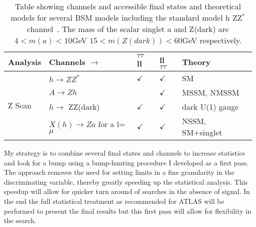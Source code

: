 \begin{table}[h]
\begin{center}
\begin{tabular}{ l |  l    |  l                   | l         || l    }  \hline 
 Analysis   & Channels        $\rightarrow$  &  $\tau \tau$ ll  & ll $\tau \tau$  &   Theory  \\ \hline \hline
\multirow{4}{*}{Z Scan} & $h\rightarrow ZZ^*$ &  $\checkmark$ & $\checkmark$                     & SM \\  

  &$A \rightarrow Zh$            &                    & $\checkmark$     &   MSSM, NMSSM \\  
  &$h \rightarrow$ ZZ(dark)  &    $ \checkmark$          & $\checkmark$  &dark U(1) gauge     \\   
  &$X(h) \rightarrow  Za$ for a l=$\mu$  &  $\checkmark$      & $\checkmark$ &   NSSM, SM+singlet\\ \hline \hline

    \hline
    \end{tabular}
    \caption{ Table showing channels and accessible final states and theoretical models for several BSM models including the standard model h \too ZZ$^*$ channel~\cite{hexotic}.  The mass of the scalar singlet a and Z(dark) are  $4  <m(a)< 10 $GeV   $15 < m(Z(dark)) < 60 $GeV respectively.}
\label{tab:anal}
\end{center}
\end{table}
My strategy is to combine several final states and channels to increase statistics and look for a bump using a bump-hunting procedure I developed as a first pass. The approach removes the need for setting limits in a fine granularity in the discriminating variable, thereby greatly speeding up the statistical analysis. This speedup will allow for quicker turn around of searches in the absence of signal.  In the end the full statistical treatment as recommended for ATLAS will be performed to present the final results but this first pass will allow for flexibility in the search. 

